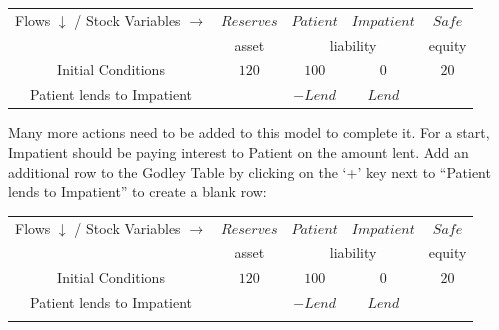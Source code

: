 \begin{center}
\begin{tabular}{|c|cccc|}
\hline
Flows $\downarrow$ / Stock Variables $\rightarrow$&\multicolumn{1}{|c|}{$Reserves$}&\multicolumn{1}{|c|}{$Patient$}&\multicolumn{1}{|c|}{$Impatient$}&\multicolumn{1}{|c|}{$Safe$}\\\cline{2-5}&\multicolumn{1}{|c|}{asset}&\multicolumn{2}{|c|}{liability}&\multicolumn{1}{|c|}{equity}\\\hline
Initial Conditions&$120$&$100$&$0$&$20$\\
Patient lends to Impatient&&$-Lend$&$Lend$&\\
\hline
\end{tabular}
\end{center}

Many more actions need to be added to this model to complete it. For a
start, Impatient should be paying interest to Patient on the amount
lent. Add an additional row to the Godley Table by clicking on the
`+' key
next to ``Patient lends to Impatient'' to create a blank row:

\begin{center}
\begin{tabular}{|c|cccc|}
\hline
Flows $\downarrow$ / Stock Variables $\rightarrow$&\multicolumn{1}{|c|}{$Reserves$}&\multicolumn{1}{|c|}{$Patient$}&\multicolumn{1}{|c|}{$Impatient$}&\multicolumn{1}{|c|}{$Safe$}\\\cline{2-5}&\multicolumn{1}{|c|}{asset}&\multicolumn{2}{|c|}{liability}&\multicolumn{1}{|c|}{equity}\\\hline
Initial Conditions&$120$&$100$&$0$&$20$\\
Patient lends to Impatient&&$-Lend$&$Lend$&\\
&&&&\\
\hline
\end{tabular}
\end{center}

